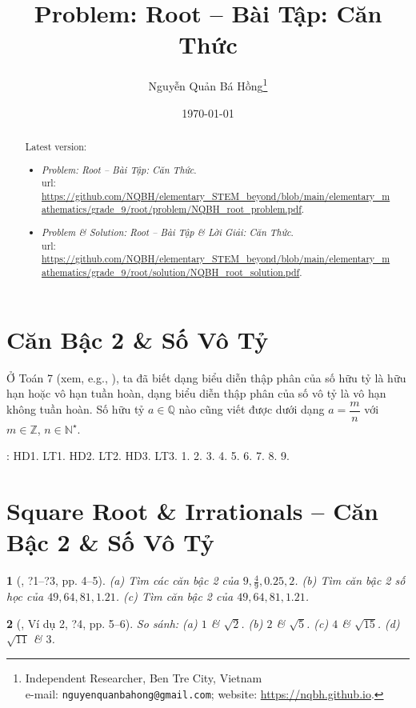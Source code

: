 \documentclass{article}
\title{Problem: Root -- Bài Tập: Căn Thức}
\author{Nguyễn Quản Bá Hồng\footnote{Independent Researcher, Ben Tre City, Vietnam\\e-mail: \texttt{nguyenquanbahong@gmail.com}; website: \url{https://nqbh.github.io}.}}
\date{\today}
\newtheorem{baitoan}{}%
\begin{document}
\maketitle
\begin{abstract}
	Latest version:
	\begin{itemize}
		\item \textit{Problem: Root -- Bài Tập: Căn Thức}.\\{\sc url}: \url{https://github.com/NQBH/elementary_STEM_beyond/blob/main/elementary_mathematics/grade_9/root/problem/NQBH_root_problem.pdf}.
		\item \textit{Problem \& Solution: Root -- Bài Tập \& Lời Giải: Căn Thức}.\\{\sc url}: \url{https://github.com/NQBH/elementary_STEM_beyond/blob/main/elementary_mathematics/grade_9/root/solution/NQBH_root_solution.pdf}.
	\end{itemize}
\end{abstract}
\tableofcontents


\section{Căn Bậc 2 \& Số Vô Tỷ}
Ở Toán 7 (xem, e.g., \cite[\S5, pp. 27--29]{SGK_Toan_7_Canh_Dieu_tap_1}), ta đã biết dạng biểu diễn thập phân của số hữu tỷ là hữu hạn hoặc vô hạn tuần hoàn, dạng biểu diễn thập phân của số vô tỷ là vô hạn không tuần hoàn. Số hữu tỷ $a\in\mathbb{Q}$ nào cũng viết được dưới dạng $a = \dfrac{m}{n}$ với $m\in\mathbb{Z}$, $n\in\mathbb{N}^\star$.

\noindent\cite[Chap. III, \S1, pp. 48--54]{SGK_Toan_9_Canh_Dieu_tap_1}: HD1. LT1. HD2. LT2. HD3. LT3. 1. 2. 3. 4. 5. 6. 7. 8. 9.

\section{Square Root \& Irrationals -- Căn Bậc 2 \& Số Vô Tỷ}

\begin{baitoan}[\cite{SGK_Toan_9_tap_1}, ?1--?3, pp. 4--5]
	(a) Tìm các căn bậc 2 của $9,\frac{4}{9},0.25,2$. (b) Tìm căn bậc 2 số học của $49,64,81,1.21$. (c) Tìm căn bậc 2 của $49,64,81,1.21$.
\end{baitoan}

\begin{baitoan}[\cite{SGK_Toan_9_tap_1}, Ví dụ 2, ?4, pp. 5--6]
	So sánh: (a) $1$ \& $\sqrt{2}$. (b) $2$ \& $\sqrt{5}$. (c) $4$ \& $\sqrt{15}$. (d) $\sqrt{11}$ \& $3$.
\end{baitoan}
\end{document}
